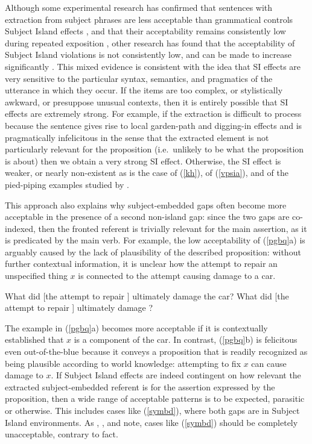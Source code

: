 \documentclass[output=paper]{langsci/langscibook}
\begin{document}
Although some experimental research has confirmed that sentences with extraction from subject phrases are less acceptable than grammatical controls Subject Island effects \citep{sprsat2,goodall11,crawfordwccfl,clausencuny,greco}, and that their acceptability
remains consistently low during repeated exposition  \citep{sprsat2,crawfordwccfl}, other research has found that the acceptability of  Subject Island violations is not consistently low, and can be made to increase significantly \citep{hiramatsu00,clausencuny,chavesjeruen,chavessubjexp}. This mixed evidence is consistent with the idea that SI effects are very sensitive to the particular syntax, semantics, and pragmatics of the utterance in which they occur. If the items are too complex, or stylistically awkward, or presuppose unusual contexts, then it is entirely possible that 
SI effects are extremely strong.  For example, if the extraction is difficult to process because the sentence gives rise to local  garden-path and digging-in effects and is pragmatically infelicitous in the sense that the extracted element is not particularly relevant for the proposition (i.e.\ unlikely to be what the proposition is about) then we obtain a very strong SI effect. Otherwise, the SI effect is weaker, or nearly non-existent as is the case of (\ref{kh}), of (\ref{vpsia}),
and of the  pied-piping examples studied by \citet{annerels}.

This approach also explains why subject-embedded gaps often become more acceptable in the presence of a second non-island gap: since the two gaps are co-indexed, then the fronted referent is trivially relevant for the main assertion, as it is predicated by the main verb. For example, the low acceptability of (\ref{pgbq}a) is arguably caused  by the lack of   plausibility of the described proposition: without further contextual information, it is unclear how the attempt to repair  an unspecified thing $x$ is connected to the attempt causing  damage to a car. 


\ea 
\ea \bad{*}What did [the attempt to repair \spcs] ultimately damage the car?
\ex What did [the attempt to repair \spcs] ultimately damage \spc?\\
\citep{colinphillips}
\z \label{pgbq}
\z


\noindent
The example in  (\ref{pgbq}a)  becomes more acceptable if it is contextually  established that $x$ is  a component of the car. In contrast, (\ref{pgbq}b) is felicitous even out-of-the-blue because it  conveys a  proposition  that is  readily recognized as being plausible according to world knowledge: attempting to fix $x$ can cause  damage to $x$.  If Subject Island effects are indeed contingent on how relevant the extracted subject-embedded referent is for the assertion expressed by the proposition, then a wide range of acceptable  patterns is to be expected, parasitic or otherwise. This includes cases like  (\ref{symbd}), where both gaps are in Subject Island environments. As \citet{Levine:Sag:03}, \citet[256]{levhubook},  and \citet[161]{Culicover13} note, cases like (\ref{symbd}) should be completely unacceptable, contrary to fact.
\end{document}
